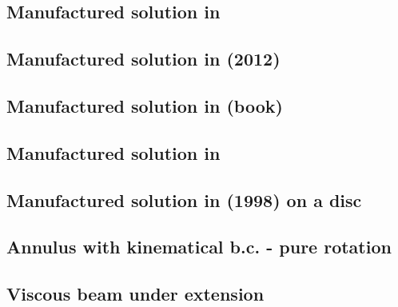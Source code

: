 \subsection{Manufactured solution in \textcite{muye17}} \label{ss:mms_muye17a}


\subsection{Manufactured solution in \textcite{bocg12} (2012)} \label{ss:mms_bocg12}


\subsection{Manufactured solution in \textcite{john16} (book)} \label{ss:mms_johnbook}


\subsection{Manufactured solution in \textcite{jokn16b}} \label{ss:mms_jokn16}


\subsection{Manufactured solution in \textcite{john98} (1998) on a disc} \label{ss:mms_john98}


\subsection{Annulus with kinematical b.c. - pure rotation} \label{ss:ankbc}


\subsection{Viscous beam under extension \label{ss:viscousbeamext}}


